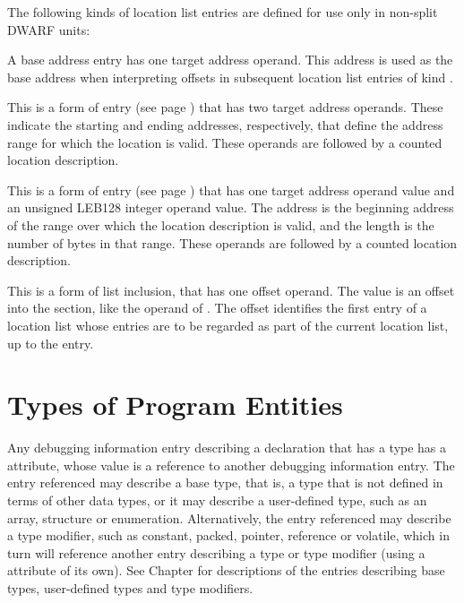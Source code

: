 The following kinds of location list entries are defined for
use only in non-split DWARF units:
   
\begin{enumerate}[1. ]
\addtocounter{enumi}{6}
\itembfnl{\DWLLEbaseaddressTARG}
A base address entry has one target address operand.
This address is used as the base address when interpreting
offsets in subsequent location list entries of kind
\DWLLEoffsetpair.

\itembfnl{\DWLLEstartendTARG}
This is a form of  entry
\bb
(see page \pageref{text:bndlocdesc})
\eb
that has two target address operands. These indicate the
starting and ending addresses, respectively, that define
the address range for which the location is valid.
These operands are followed by a counted location description.
       
\itembfnl{\DWLLEstartlengthTARG}
This is a form of  entry
\bb
(see page \pageref{text:bndlocdesc})
\eb
that has one target address operand value and an unsigned LEB128
integer operand value. The address is the beginning address
of the range over which the location description is valid, and
the length is the number of bytes in that range.
These operands are followed by a counted location description.

\bb
\itembfnl{\DWLLEincludeloclistTARG}
This is a form of list inclusion, that has one offset operand.  The
value is an offset into the \dotdebugloclists{} section, like the
operand of \DWFORMsecoffset{}.  The offset identifies the
first entry of a location list whose entries are to be regarded as part of
the current location  list, up to the \DWLLEendoflist{} entry.
\eb

\end{enumerate}

\section{Types of Program Entities}
\label{chap:typesofprogramentities}
\hypertarget{chap:DWATtypetypeofdeclaration}{}
Any debugging information entry describing a declaration that
has a type has 
a \DWATtypeDEFN{} attribute, whose value is a
reference to another debugging information entry. The entry
referenced may describe a base type, that is, a type that is
not defined in terms of other data types, or it may describe a
user-defined type, such as an array, structure or enumeration.
Alternatively, the entry referenced may describe a type
modifier, such as constant, packed, pointer, reference or
volatile, which in turn will reference another entry describing
a type or type modifier (using a
\DWATtypeNAME{} attribute of its
own). See Chapter  
for descriptions of the entries describing
base types, user-defined types and type modifiers.


